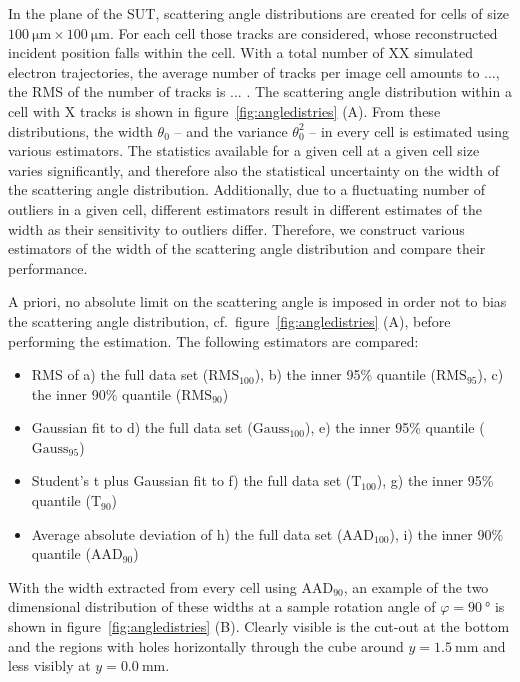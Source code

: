 \documentclass{PoS}
\newcommand{\rmshundred}{\ensuremath{\textrm{RMS}_\textrm{100}}}
\newcommand{\rmsninetyfive}{\ensuremath{\textrm{RMS}_\textrm{95}}}
\newcommand{\rmsninety}{\ensuremath{\textrm{RMS}_\textrm{90}}}
\newcommand{\gausshundred}{\ensuremath{\textrm{Gauss}_\textrm{100}}}
\newcommand{\gaussninety}{\ensuremath{\textrm{Gauss}_\textrm{95}}}
\newcommand{\studhundred}{\ensuremath{\textrm{T}_\textrm{100}}}
\newcommand{\studninety}{\ensuremath{\textrm{T}_\textrm{90}}}
\newcommand{\aadhundred}{\ensuremath{\textrm{AAD}_\textrm{100}}}
\newcommand{\aadninety}{\ensuremath{\textrm{AAD}_\textrm{90}}}
\begin{document}
In the plane of the SUT, scattering angle distributions are created for cells of size $\SI{100}{\um} \times \SI{100}{\um}$. 
For each cell those tracks are considered, whose reconstructed incident position falls within the cell. 
With a total number of XX simulated electron trajectories, the average number of tracks per image cell amounts to ..., the RMS of the number of tracks is ... . %
The scattering angle distribution within a cell with X tracks is shown in figure~\ref{fig:angledistries} (A). %
From these distributions, the width $\theta_0$ -- and the variance $\theta_0^2$ -- in every cell is estimated using various estimators. 
The statistics available for a given cell at a given cell size varies significantly, and therefore also the statistical uncertainty on the width of the scattering angle distribution. 
Additionally, due to a fluctuating number of outliers in a given cell, different estimators result in different estimates of the width as their sensitivity to outliers differ. 
Therefore, we construct various estimators of the width of the scattering angle distribution and compare their performance. 

A priori, no absolute limit on the scattering angle is imposed in order not to bias the scattering angle distribution, cf.\ figure~\ref{fig:angledistries} (A), before performing the estimation. 
The following estimators are compared:
\begin{itemize}\itemsep0pt
 \item RMS of a) the full data set ($\rmshundred$), b) the inner 95\% quantile ($\rmsninetyfive$), c) the inner 90\% quantile ($\rmsninety$)
 \item Gaussian fit to d) the full data set ($\gausshundred$), e) the inner 95\% quantile ($\gaussninety$)
 \item Student's t plus Gaussian fit to f) the full data set ($\studhundred$), g) the inner 95\% quantile ($\studninety$)
 \item Average absolute deviation of h) the full data set ($\aadhundred$), i) the inner 90\% quantile ($\aadninety$)
 
\end{itemize}

With the width extracted from every cell using $\aadninety$,
 an example of the two dimensional distribution of these widths at a sample rotation angle of $\varphi = \SI{90}{\degree}$ is shown in figure~\ref{fig:angledistries} (B). 
Clearly visible is the cut-out at the bottom and the regions with holes horizontally through the cube around $y=\SI{1.5}{\mm}$ and less visibly at $y=\SI{0.0}{\mm}$.
\end{document}
